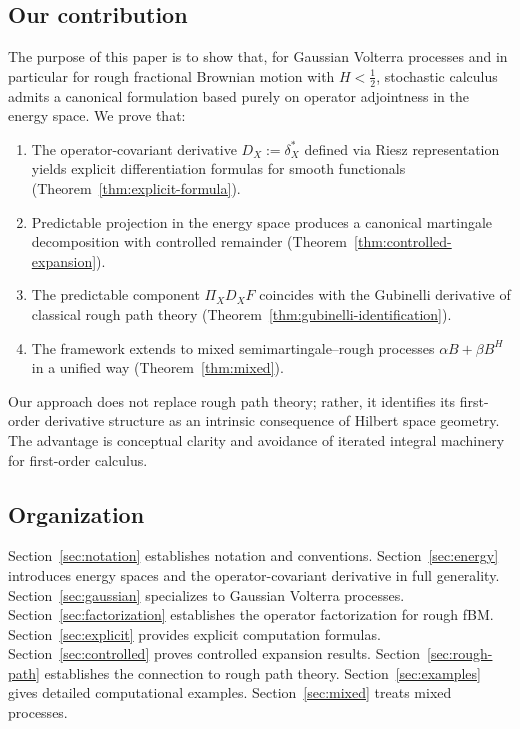 \documentclass[11pt,a4paper]{article}
\theoremstyle{plain}
\theoremstyle{definition}
\theoremstyle{remark}
\begin{document}
\subsection{Our contribution}

The purpose of this paper is to show that, for Gaussian Volterra processes and in particular for rough fractional Brownian motion with $H < \frac{1}{2}$, stochastic calculus admits a canonical formulation based purely on operator adjointness in the energy space. We prove that:

\begin{enumerate}
\item The operator-covariant derivative $D_X := \delta_X^*$ defined via Riesz representation yields explicit differentiation formulas for smooth functionals (Theorem~\ref{thm:explicit-formula}).

\item Predictable projection in the energy space produces a canonical martingale decomposition with controlled remainder (Theorem~\ref{thm:controlled-expansion}).

\item The predictable component $\Pi_X D_X F$ coincides with the Gubinelli derivative of classical rough path theory (Theorem~\ref{thm:gubinelli-identification}).

\item The framework extends to mixed semimartingale--rough processes $\alpha B + \beta B^H$ in a unified way (Theorem~\ref{thm:mixed}).
\end{enumerate}

Our approach does not replace rough path theory; rather, it identifies its first-order derivative structure as an intrinsic consequence of Hilbert space geometry. The advantage is conceptual clarity and avoidance of iterated integral machinery for first-order calculus.

\subsection{Organization}

Section~\ref{sec:notation} establishes notation and conventions. Section~\ref{sec:energy} introduces energy spaces and the operator-covariant derivative in full generality. Section~\ref{sec:gaussian} specializes to Gaussian Volterra processes. Section~\ref{sec:factorization} establishes the operator factorization for rough fBM. Section~\ref{sec:explicit} provides explicit computation formulas. Section~\ref{sec:controlled} proves controlled expansion results. Section~\ref{sec:rough-path} establishes the connection to rough path theory. Section~\ref{sec:examples} gives detailed computational examples. Section~\ref{sec:mixed} treats mixed processes.
\end{document}
